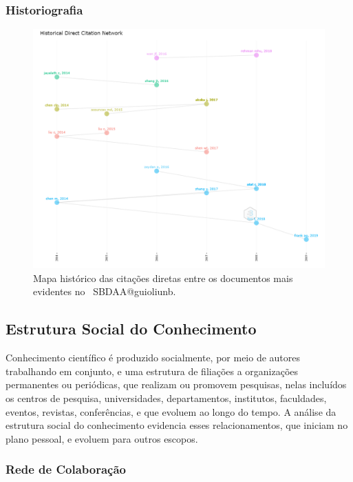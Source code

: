 \subsubsection{Historiografia}

\begin{figure}
    \centering
    \includegraphics[width=1\textwidth]{experiments/guioliunb/AnaliseBibliometrica/SocialBigDataAnalysis/historiograph.png}
    \caption{Mapa histórico das citações diretas entre os documentos mais evidentes no  \dataset\ SBDAA@guioliunb.}
    \label{fig:MASSA2-HistoricalDirectCitationNetwork-100docs}
\end{figure}

\subsection{Estrutura Social  do Conhecimento}

Conhecimento científico é produzido socialmente, por meio de autores trabalhando em conjunto, e uma estrutura de filiações a organizações permanentes ou periódicas, que realizam ou promovem pesquisas, nelas incluídos os centros de pesquisa, universidades, departamentos, institutos, faculdades, eventos, revistas, conferências, e que evoluem ao longo do tempo. A análise da estrutura social do conhecimento evidencia esses relacionamentos, que iniciam no plano pessoal, e evoluem para outros escopos.

\subsubsection{Rede de Colaboração}

